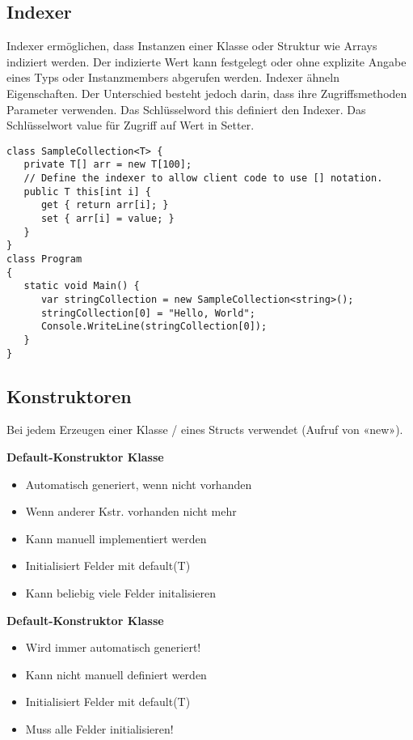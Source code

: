 \subsection{Indexer}
Indexer ermöglichen, dass Instanzen einer Klasse oder Struktur wie Arrays indiziert werden. Der indizierte Wert kann festgelegt oder ohne explizite Angabe eines Typs oder Instanzmembers abgerufen werden. Indexer ähneln Eigenschaften. Der Unterschied besteht jedoch darin, dass ihre Zugriffsmethoden Parameter verwenden. Das Schlüsselword this definiert den Indexer. Das Schlüsselwort value für Zugriff auf Wert in Setter.
\begin{lstlisting}
class SampleCollection<T> {
   private T[] arr = new T[100];
   // Define the indexer to allow client code to use [] notation.
   public T this[int i] {
      get { return arr[i]; }
      set { arr[i] = value; }
   }
}
class Program
{
   static void Main() {
      var stringCollection = new SampleCollection<string>();
      stringCollection[0] = "Hello, World";
      Console.WriteLine(stringCollection[0]);
   }
}
\end{lstlisting}

\subsection{Konstruktoren}
Bei jedem Erzeugen einer Klasse / eines Structs verwendet (Aufruf von «new»).

\begin{minipage}{0,5\linewidth}
\textbf{Default-Konstruktor Klasse}
\begin{itemize}
  \itemsep -0.5em 
  \item Automatisch generiert, wenn nicht vorhanden
  \item Wenn anderer Kstr. vorhanden nicht mehr
  \item Kann manuell implementiert werden
  \item Initialisiert Felder mit default(T)
  \item Kann beliebig viele Felder initalisieren
\end{itemize}
\end{minipage}
\begin{minipage}{0,5\linewidth}
\textbf{Default-Konstruktor Klasse}
\begin{itemize}
  \itemsep -0.5em 
  \item Wird immer automatisch generiert!
  \item Kann nicht manuell definiert werden
  \item Initialisiert Felder mit default(T)
  \item Muss alle Felder initialisieren!
\end{itemize}
\end{minipage}

